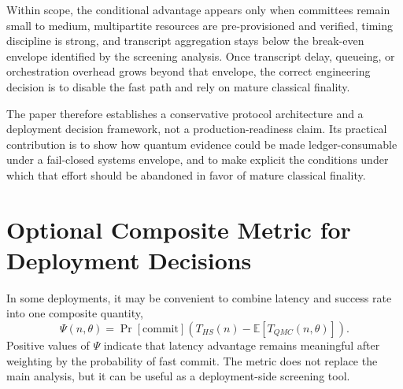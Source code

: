 \documentclass{ieeeaccess}
\begin{document}
Within scope, the conditional advantage appears only when committees remain small to medium, multipartite resources are pre-provisioned and verified, timing discipline is strong, and transcript aggregation stays below the break-even envelope identified by the screening analysis. Once transcript delay, queueing, or orchestration overhead grows beyond that envelope, the correct engineering decision is to disable the fast path and rely on mature classical finality.

The paper therefore establishes a conservative protocol architecture and a deployment decision framework, not a production-readiness claim. Its practical contribution is to show how quantum evidence could be made ledger-consumable under a fail-closed systems envelope, and to make explicit the conditions under which that effort should be abandoned in favor of mature classical finality.

\appendices
\section{Optional Composite Metric for Deployment Decisions}
In some deployments, it may be convenient to combine latency and success rate into one composite quantity,
\begin{equation}
\Psi(n,\theta) = \Pr[\mathrm{commit}]\left(T_{HS}(n)-\mathbb{E}[T_{QMC}(n,\theta)]\right).
\label{eq:psi}
\end{equation}
Positive values of $\Psi$ indicate that latency advantage remains meaningful after weighting by the probability of fast commit. The metric does not replace the main analysis, but it can be useful as a deployment-side screening tool.
\end{document}
